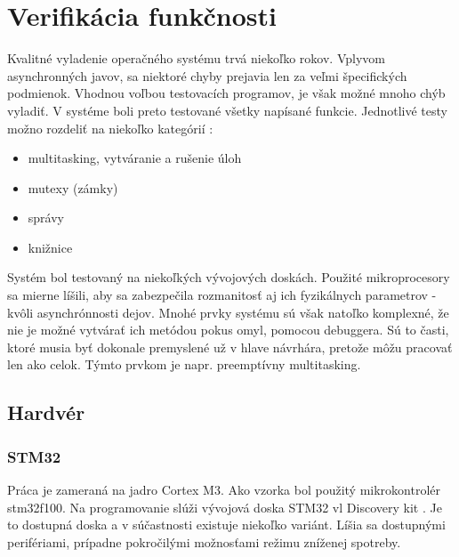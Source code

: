 \chapter{Verifikácia funkčnosti}

Kvalitné vyladenie operačného systému trvá niekoľko rokov. Vplyvom asynchronných javov, sa niektoré chyby prejavia len za veľmi špecifických podmienok. Vhodnou voľbou testovacích programov, je však možné mnoho chýb vyladiť. V systéme boli preto testované všetky napísané funkcie.
Jednotlivé testy možno rozdeliť na niekoľko kategórií :
\begin{itemize}
	\item multitasking, vytváranie a rušenie úloh
	\item mutexy (zámky)
	\item správy
	\item knižnice
\end{itemize}

Systém bol testovaný na niekoľkých vývojových doskách. Použité mikroprocesory sa mierne líšili, aby sa zabezpečila rozmanitosť aj ich fyzikálnych parametrov - kvôli asynchrónnosti dejov. Mnohé prvky systému sú však natoľko komplexné, že nie je možné vytvárať ich metódou pokus omyl, pomocou debuggera. Sú to časti, ktoré musia byť dokonale premyslené už v hlave návrhára, pretože môžu pracovať len ako celok. Týmto prvkom je napr. preemptívny multitasking.

\section {Hardvér}
\subsection {STM32}
Práca je zameraná na jadro Cortex M3. Ako vzorka bol použitý mikrokontrolér stm32f100. Na programovanie slúži vývojová doska STM32 vl Discovery kit \cite{discovery_kit}. Je to dostupná doska a v súčastnosti existuje niekoľko variánt. Líšia sa dostupnými perifériami, prípadne pokročilými možnosťami režimu zníženej spotreby.


